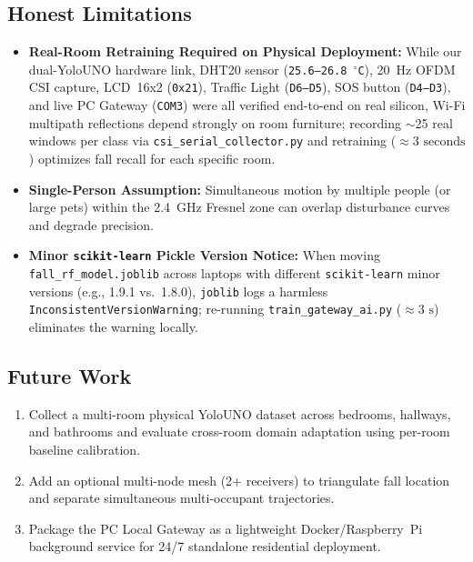 \documentclass{hcmut-report}
\begin{document}
\subsection{Honest Limitations}
\begin{itemize}
  \item \textbf{Real-Room Retraining Required on Physical Deployment:} While our dual-YoloUNO hardware link, DHT20 sensor (\texttt{25.6--26.8~$^\circ$C}), 20~Hz OFDM CSI capture, LCD~16x2 (\texttt{0x21}), Traffic Light (\texttt{D6--D5}), SOS button (\texttt{D4--D3}), and live PC Gateway (\texttt{COM3}) were all verified end-to-end on real silicon, Wi-Fi multipath reflections depend strongly on room furniture; recording $\sim$25 real windows per class via \texttt{csi\_serial\_collector.py} and retraining ($\approx 3\text{ seconds}$) optimizes fall recall for each specific room.
  \item \textbf{Single-Person Assumption:} Simultaneous motion by multiple people (or large pets) within the 2.4~GHz Fresnel zone can overlap disturbance curves and degrade precision.
  \item \textbf{Minor \texttt{scikit-learn} Pickle Version Notice:} When moving \texttt{fall\_rf\_model.joblib} across laptops with different \texttt{scikit-learn} minor versions (e.g., 1.9.1 vs.\ 1.8.0), \texttt{joblib} logs a harmless \texttt{InconsistentVersionWarning}; re-running \texttt{train\_gateway\_ai.py} ($\approx 3\text{ s}$) eliminates the warning locally.
\end{itemize}

\subsection{Future Work}
\begin{enumerate}
  \item Collect a multi-room physical YoloUNO dataset across bedrooms, hallways, and bathrooms and evaluate cross-room domain adaptation using per-room baseline calibration.
  \item Add an optional multi-node mesh (2+ receivers) to triangulate fall location and separate simultaneous multi-occupant trajectories.
  \item Package the PC Local Gateway as a lightweight Docker/Raspberry~Pi background service for 24/7 standalone residential deployment.
\end{enumerate}

\end{document}
